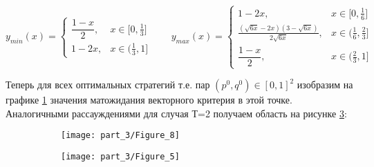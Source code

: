 $
	y_{min}(x) =
	\begin{cases}
		\dfrac{1 - x}{2}, & x \in \big[0, \frac{1}{3} \big] 
		\\
		1 - 2x, & x \in \big( \frac{1}{3}, 1\big]
	\end{cases}
	\qquad
	y_{max}(x) =
	\begin{cases}
		1 - 2x, & x \in \big[0, \frac{1}{6} \big] 
		\\
		\frac{(\sqrt{6x} - 2x)(3 - \sqrt{6x})}{2 \sqrt{6x}}, &
		x \in \big(\frac{1}{6}, \frac{2}{3} \big]
		\\
		\dfrac{1 - x}{2}, & x \in \big(\frac{2}{3}, 1 \big]
	\end{cases}
$

Теперь для всех
оптимальных стратегий т.е. пар $(p^0, q^0) \in [0, 1]^{2}$ изобразим на графике
\ref{fig:EF_1} значения матожидания векторного критерия в этой точке.
Аналогичными рассауждениями для случая Т=2 получаем область на
рисунке \ref{fig:EF_2}:

\begin{figure}[H]
	\centering
	\begin{subfigure}[b]{0.47 \textwidth}
		\centering		
		\texttt{[image: part\_3/Figure\_8]}
		\caption{}
		\label{fig:EF_1}
	\end{subfigure}	
	\begin{subfigure}[b]{0.47 \textwidth}
		\centering		
		\texttt{[image: part\_3/Figure\_5]}
		\caption{}
		\label{fig:EF_2}
	\end{subfigure}
	\caption{}	
\end{figure}